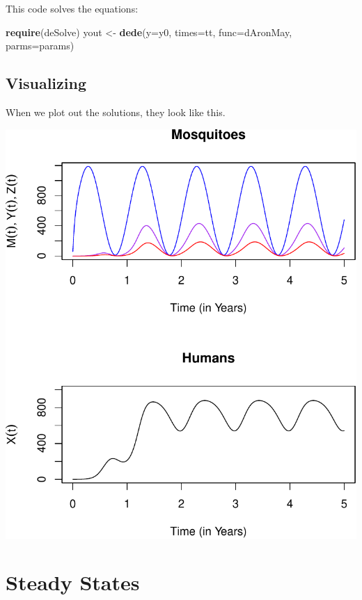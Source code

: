\documentclass[
]{book}
\newenvironment{Shaded}{\begin{snugshade}}{\end{snugshade}}
\newcommand{\AttributeTok}[1]{\textcolor[rgb]{0.13,0.29,0.53}{#1}}
\newcommand{\FunctionTok}[1]{\textcolor[rgb]{0.13,0.29,0.53}{\textbf{#1}}}
\newcommand{\NormalTok}[1]{#1}
\newcommand{\OtherTok}[1]{\textcolor[rgb]{0.56,0.35,0.01}{#1}}
\begin{document}
This code solves the equations:

\begin{Shaded}
\begin{Highlighting}[]
\FunctionTok{require}\NormalTok{(deSolve)}
\NormalTok{yout }\OtherTok{\textless{}{-}} \FunctionTok{dede}\NormalTok{(}\AttributeTok{y=}\NormalTok{y0, }\AttributeTok{times=}\NormalTok{tt, }\AttributeTok{func=}\NormalTok{dAronMay, }\AttributeTok{parms=}\NormalTok{params) }
\end{Highlighting}
\end{Shaded}

\hypertarget{visualizing}{%
\subsection{Visualizing}\label{visualizing}}

When we plot out the solutions, they look like this.

\includegraphics{_main_files/figure-latex/unnamed-chunk-10-1.pdf}

\clearpage

\hypertarget{steady-states}{%
\section{Steady States}\label{steady-states}}
\end{document}

